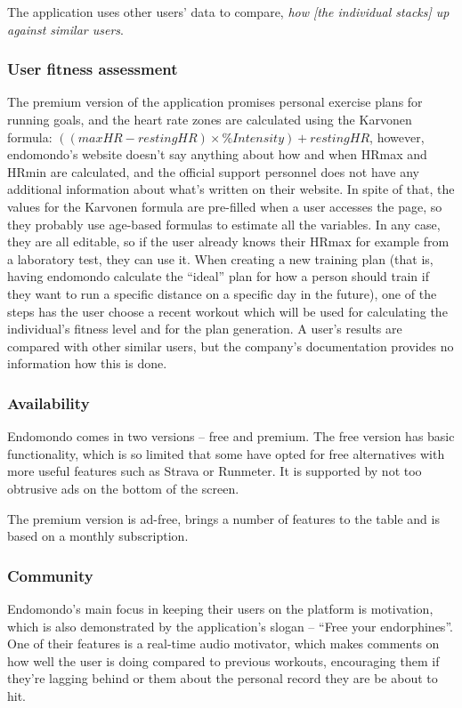 The application uses other users' data to compare, \textit{how [the individual stacks] up against similar users}.\cite{endomondo-premium-features} 
\subsubsection*{User fitness assessment}
The premium version of the application promises personal exercise plans for running goals, and the heart rate zones are calculated using the Karvonen formula: $((max HR − resting HR) × \% Intensity) + resting HR$,
however, endomondo's website doesn't say anything about how and when HRmax and HRmin are calculated, and the official support personnel does not have any additional information about what's written on their website.\cite{endomondo-HR-max-emails}
In spite of that, the values for the Karvonen formula are pre-filled when a user accesses the page, so they probably use age-based formulas to estimate all the variables.
In any case, they are all editable, so if the user already knows their HRmax for example from a laboratory test, they can use it.
When creating a new training plan (that is, having endomondo calculate the ``ideal'' plan for how a person should train if they want to run a specific distance on a specific day in the future),
one of the steps has the user choose a recent workout which will be used for calculating the individual's fitness level and for the plan generation.\cite{endomondo-training-plan-fitness-assessment}
A user's results are compared with other similar users, but the company's documentation provides no information how this is done.\cite{endomondo-HR-max-emails}
\subsubsection*{Availability}
Endomondo comes in two versions -- free and premium.
The free version has basic functionality, which is so limited that some have opted for free alternatives with more useful features such as Strava or Runmeter.\cite{endomondo-review}
It is supported by not too obtrusive ads on the bottom of the screen.

The premium version is ad-free, brings a number of features to the table and is based on a monthly subscription.

\subsubsection*{Community}
Endomondo's main focus in keeping their users on the platform is motivation, which is also demonstrated by the application's slogan -- ``Free your endorphines''.
One of their features is a real-time audio motivator, which makes comments on how well the user is doing compared to previous workouts,
encouraging them if they're lagging behind or  them about the personal record they are be about to hit.

